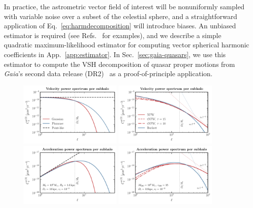 \documentclass[prd,aps,twocolumn,nofootinbib,superscriptaddress,preprintnumbers,balancelastpage,longbibliography,floatfix]{revtex4-1}
\begin{document}
In practice, the astrometric vector field of interest will be nonuniformly sampled with variable noise over a subset of the celestial sphere, and a straightforward application of Eq.~\eqref{eq:harmdecomposition} will introduce biases. An unbiased estimator is required (see Refs.~\cite{2019arXiv190800041L,Dahlen:2007sv,Kostelec:2000:CHA:351065.351076} for examples), and we describe a simple quadratic maximum-likelihood estimator for computing vector spherical harmonic coefficients in App.~\ref{app:estimator}. In Sec.~\ref{sec:gaia-quasars}, we use this estimator to compute the VSH decomposition of quasar proper motions from \emph{Gaia}'s second data release (DR2)~\cite{Prusti:2016bjo,Brown:2018dum} as a proof-of-principle application.

\begin{figure}[htbp]
\centering
\includegraphics[width=0.45\textwidth]{plots/mu_single_1.pdf}
\includegraphics[width=0.45\textwidth]{plots/mu_single_2.pdf}
\includegraphics[width=0.45\textwidth]{plots/alpha_single_1.pdf}
\includegraphics[width=0.45\textwidth]{plots/alpha_single_2.pdf}

\end{figure}
\end{document}
